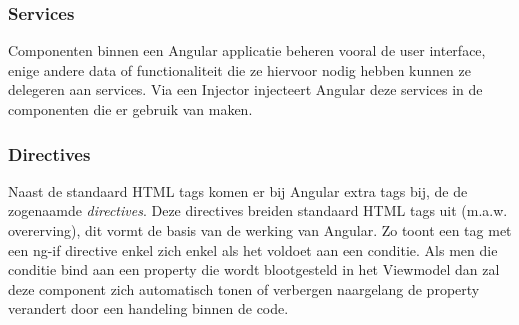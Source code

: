 \subsubsection{Services}
Componenten binnen een Angular applicatie beheren vooral de user interface, enige andere data of functionaliteit die ze hiervoor nodig hebben kunnen ze delegeren aan services. Via een Injector injecteert Angular deze services in de componenten die er gebruik van maken. 

\subsubsection{Directives}
Naast de standaard HTML tags komen er bij Angular extra tags bij, de de zogenaamde \textit{directives}. Deze directives breiden standaard HTML tags uit (m.a.w. overerving), dit vormt de basis van de werking van Angular. Zo toont een tag met een ng-if directive enkel zich enkel als het voldoet aan een conditie. Als men die conditie bind aan een property die wordt blootgesteld in het Viewmodel dan zal deze component zich automatisch tonen of verbergen naargelang de property verandert door een handeling binnen de code.  

